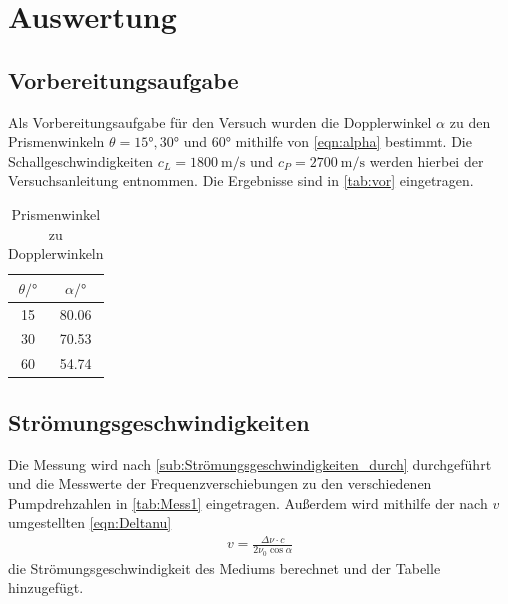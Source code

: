 \section{Auswertung}
\label{sec:Auswertung}

\subsection{Vorbereitungsaufgabe}
Als Vorbereitungsaufgabe für den Versuch wurden die Dopplerwinkel $\alpha$ zu den Prismenwinkeln $\theta = 15° , 30°$ und $60°$
mithilfe von \autoref{eqn:alpha} bestimmt.
Die Schallgeschwindigkeiten $c_L=\qty{1800}{\meter\per\second}$ und $c_P=\qty{2700}{\meter\per\second}$ werden hierbei der Versuchsanleitung
\cite{VUS3} entnommen.
Die Ergebnisse sind in \autoref{tab:vor} eingetragen.

\begin{table}[H]
    \centering
    \caption{Prismenwinkel zu Dopplerwinkeln}
    \begin{tabular}{S[table-format=2.0] S[table-format=2.2]}
        \toprule
        {$\theta / \si{\degree}$} & {$\alpha  / \si{\degree}$}  \\
         & 80.06  \\
        30 & 70.53  \\
        60 & 54.74  \\
        \bottomrule
    \end{tabular}
    \label{tab:vor}
\end{table}

\subsection{Strömungsgeschwindigkeiten}
\label{sub:Strömungsgeschwindigkeiten}

Die Messung wird nach \autoref{sub:Strömungsgeschwindigkeiten_durch} durchgeführt und die Messwerte der Frequenzverschiebungen
zu den verschiedenen Pumpdrehzahlen in \autoref{tab:Mess1} eingetragen.
Außerdem wird mithilfe der nach $v$ umgestellten \autoref{eqn:Deltanu}
\begin{align}
  v= \frac{\Delta \nu \cdot c}{2 \nu_0 \cos{\alpha}} \label{eqn:v}
\end{align}
die Strömungsgeschwindigkeit des Mediums berechnet und der Tabelle hinzugefügt. 

